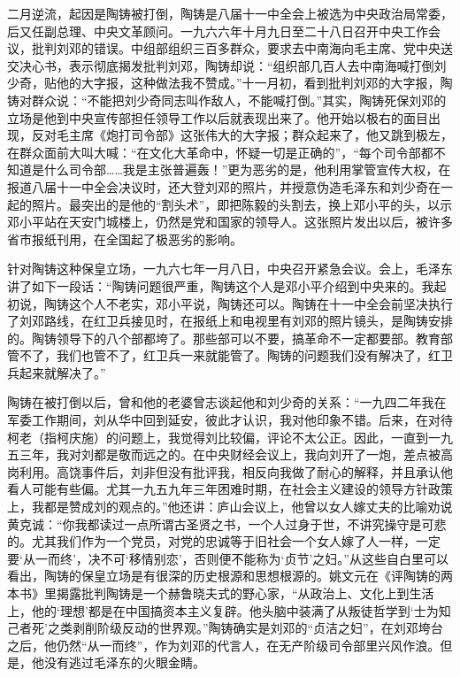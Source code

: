 \begin{maonote}
二月逆流，起因是陶铸被打倒，陶铸是八届十一中全会上被选为中央政治局常委，后又任副总理、中央文革顾问。一九六六年十月九日至二十八日召开中央工作会议，批判刘邓的错误。中组部组织三百多群众，要求去中南海向毛主席、党中央送交决心书，表示彻底揭发批判刘邓，陶铸却说：“组织部几百人去中南海喊打倒刘少奇，贴他的大字报，这种做法我不赞成。”十一月初，看到批判刘邓的大字报，陶铸对群众说：“不能把刘少奇同志叫作敌人，不能喊打倒。”其实，陶铸死保刘邓的立场是他到中央宣传部担任领导工作以后就表现出来了。他开始以极右的面目出现，反对毛主席《炮打司令部》这张伟大的大字报；群众起来了，他又跳到极左，在群众面前大叫大喊：“在文化大革命中，怀疑一切是正确的”，“每个司令部都不知道是什么司令部……我是主张普遍轰！”更为恶劣的是，他利用掌管宣传大权，在报道八届十一中全会决议时，还大登刘邓的照片，并授意伪造毛泽东和刘少奇在一起的照片。最突出的是他的“割头术”，即把陈毅的头割去，换上邓小平的头，以示邓小平站在天安门城楼上，仍然是党和国家的领导人。这张照片发出以后，被许多省市报纸刊用，在全国起了极恶劣的影响。

针对陶铸这种保皇立场，一九六七年一月八日，中央召开紧急会议。会上，毛泽东讲了如下一段话：“陶铸问题很严重，陶铸这个人是邓小平介绍到中央来的。我起初说，陶铸这个人不老实，邓小平说，陶铸还可以。陶铸在十一中全会前坚决执行了刘邓路线，在红卫兵接见时，在报纸上和电视里有刘邓的照片镜头，是陶铸安排的。陶铸领导下的八个部都垮了。那些部可以不要，搞革命不一定都要部。教育部管不了，我们也管不了，红卫兵一来就能管了。陶铸的问题我们没有解决了，红卫兵起来就解决了。”

陶铸在被打倒以后，曾和他的老婆曾志谈起他和刘少奇的关系：“一九四二年我在军委工作期间，刘从华中回到延安，彼此才认识，我对他印象不错。后来，在对待柯老（指柯庆施）的问题上，我觉得刘比较偏，评论不太公正。因此，一直到一九五三年，我对刘都是敬而远之的。在中央财经会议上，我向刘开了一炮，差点被高岗利用。高饶事件后，刘非但没有批评我，相反向我做了耐心的解释，并且承认他看人可能有些偏。尤其一九五九年三年困难时期，在社会主义建设的领导方针政策上，我都是赞成刘的观点的。”他还讲：庐山会议上，他曾以女人嫁丈夫的比喻劝说黄克诚：“你我都读过一点所谓古圣贤之书，一个人过身于世，不讲究操守是可悲的。尤其我们作为一个党员，对党的忠诚等于旧社会一个女人嫁了人一样，一定要‘从一而终’，决不可‘移情别恋’，否则便不能称为‘贞节’之妇。”从这些自白里可以看出，陶铸的保皇立场是有很深的历史根源和思想根源的。姚文元在《评陶铸的两本书》里揭露批判陶铸是一个赫鲁晓夫式的野心家，“从政治上、文化上到生活上，他的‘理想’都是在中国搞资本主义复辟。他头脑中装满了从叛徒哲学到‘士为知己者死’之类剥削阶级反动的世界观。”陶铸确实是刘邓的“贞洁之妇”，在刘邓垮台之后，他仍然“从一而终”，作为刘邓的代言人，在无产阶级司令部里兴风作浪。但是，他没有逃过毛泽东的火眼金睛。


\end{maonote}
